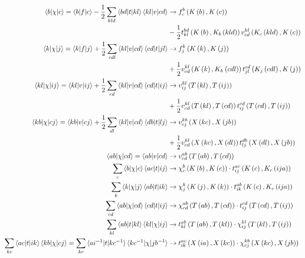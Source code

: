  \begin{align}
  \braket{b| \chi |c} = \braket{b|f|c} - \frac{1}{2} \sum_{kld}
  \braket{bd|t|kl} \braket{kl|v|cd} &\rightarrow f_{c}^{b}\left(
  K\left( b\right),K\left( c\right)\right)\\ \nonumber & -
  \frac{1}{2}t_{kl}^{bd}\left( K\left( b\right),K_{b}\left(
  kld\right)\right) v_{cd}^{kl}\left( K_{c}\left(
  kld\right),K\left( c\right)\right) \\ \braket{k| \chi |j} =
  \braket{k|f|j} + \frac{1}{2} \sum_{cdl} \braket{kl|v|cd}
  \braket{cd|t|jl} &\rightarrow f_{j}^{k}\left( K\left(
  k\right),K\left( j\right)\right) \\ \nonumber &+ \frac{1}{2}v_{cd}^{kl}\left(
  K\left( k\right),K_{k}\left( cdl\right)\right)
  t_{jl}^{cd}\left( K_{j}\left( cdl\right),K\left( j\right)\right)
  \\ \braket{kl| \chi |ij} = \braket{kl|v|ij} + \frac{1}{2} \sum_{cd}
  \braket{kl|v|cd} \braket{cd|t|ij} &\rightarrow v_{ij}^{kl}\left(
  T\left( kl\right),T\left( ij\right)\right)\\ \nonumber  &+ 
  \frac{1}{2}v_{cd}^{kl}\left( T\left( kl\right),T\left(
  cd\right)\right) t_{ij}^{cd}\left( T\left( cd\right),T\left(
  ij\right)\right) \\ \braket{kb| \chi |cj} = \braket{kb|v|cj} +
  \frac{1}{2} \sum_{dl} \braket{kl|v|cd} \braket{db|t|lj} &\rightarrow
  v_{cj}^{kb}\left( X\left( kc\right),X\left( jb\right)\right)\\ \nonumber  &+
  \frac{1}{2}v_{cd}^{kl}\left( X\left( kc\right),X\left(
  dl\right)\right) t_{lj}^{db}\left( X\left( dl\right),X\left(
  jb\right)\right) \\ \braket{ab| \chi |cd} = \braket{ab|v|cd}
  &\rightarrow v_{cd}^{ab}\left( T\left( ab\right),T\left(
  cd\right)\right) \\ \sum_{c} \braket{b| \chi |c} \braket{ac| t |ij}
  &\rightarrow \chi_{c}^{b}\left( K\left( b\right),K\left(
  c\right)\right)\cdot t_{ij}^{ac}\left( K\left( c\right), K_{c}\left(
  ija\right)\right) \\ \sum_{k} \braket{k| \chi |j} \braket{ab| t |ik}
  &\rightarrow \chi_{j}^{k}\left( K\left( j\right),K\left(
  k\right)\right)\cdot t_{ik}^{ab}\left( K\left( c\right), K_{c}\left(
  ija\right)\right) \\ \sum_{cd} \braket{ab| \chi |cd} \braket{cd| t
    |ij} &\rightarrow \chi_{cd}^{ab}\left( T\left( ab\right),T\left(
  cd\right)\right)\cdot t_{ij}^{cd}\left( T\left( cd\right),T\left(
  ij\right)\right) \\ \sum_{kl} \braket{ab| t |kl} \braket{kl| \chi
    |ij} &\rightarrow t_{kl}^{ab}\left( T\left( ab\right),T\left(
  kl\right)\right)\cdot \chi_{ij}^{kl}\left( T\left( kl\right),T\left(
  ij\right)\right) \\ \sum_{kc} \braket{ac| t |ik}\braket{kb| \chi
    |cj} = \sum_{kc} \braket{ai^{-1}| t |kc^{-1}}\braket{kc^{-1}| \chi
    |jb^{-1}} &\rightarrow t_{ik}^{ac}\left( X\left( ia\right),X\left(
  kc\right)\right)\cdot \chi_{cj}^{kb}\left( X\left( kc\right),X\left(
  jb\right)\right)
  \end{align}
